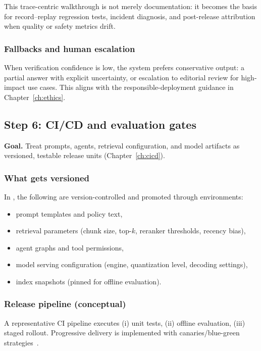 This trace-centric walkthrough is not merely documentation: it becomes the basis for record--replay regression tests, incident diagnosis, and post-release attribution when quality or safety metrics drift.

\subsubsection{Fallbacks and human escalation}
When verification confidence is low, the system prefers conservative output: a partial answer with explicit uncertainty, or escalation to editorial review for high-impact use cases.
This aligns with the responsible-deployment guidance in Chapter~\ref{ch:ethics}.

\subsection{Step 6: CI/CD and evaluation gates}
\label{sec:ishtar-step-cicd}

\textbf{Goal.} Treat prompts, agents, retrieval configuration, and model artifacts as versioned, testable release units (Chapter~\ref{ch:cicd}).

\subsubsection{What gets versioned}
In \ishtar{}, the following are version-controlled and promoted through environments:
\begin{itemize}
    \item prompt templates and policy text,
    \item retrieval parameters (chunk size, top-$k$, reranker thresholds, recency bias),
    \item agent graphs and tool permissions,
    \item model serving configuration (engine, quantization level, decoding settings),
    \item index snapshots (pinned for offline evaluation).
\end{itemize}

\subsubsection{Release pipeline (conceptual)}
A representative CI pipeline executes (i) unit tests, (ii) offline evaluation, (iii) staged rollout.
Progressive delivery is implemented with canaries/blue-green strategies~\cite{argo_rollouts_overview,argo_rollouts_canary}.

